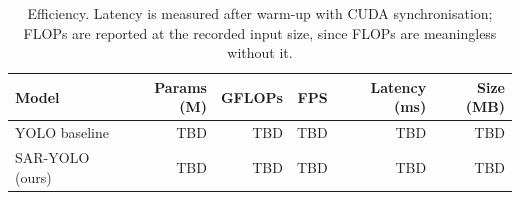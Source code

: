 \begin{table}[t]
\centering
\caption{Efficiency. Latency is measured after warm-up with CUDA synchronisation; FLOPs are reported at the recorded input size, since FLOPs are meaningless without it.}
\label{tab:efficiency}
\begin{tabular}{lrrrrr}
\toprule
Model & Params (M) & GFLOPs & FPS & Latency (ms) & Size (MB) \\
\midrule
YOLO baseline & TBD & TBD & TBD & TBD & TBD \\
SAR-YOLO (ours) & TBD & TBD & TBD & TBD & TBD \\
\bottomrule
\end{tabular}
\end{table}

